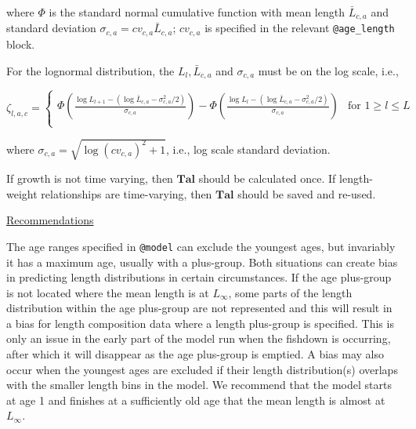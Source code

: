 \documentclass[a4paper,11pt,twoside,pdftex,draft]{article}
\begin{document}
where $\Phi$ is the standard normal cumulative function with mean length $\bar L_{c,a}$ and standard deviation $\sigma_{c,a} = cv_{c,a} \bar L_{c,a}$; $cv_{c,a}$ is specified in the relevant  \texttt{@age\_length} block.

For the lognormal distribution, the $L_{l}, \bar L_{c,a}$ and $\sigma_{c,a}$ must be on the log scale, i.e.,

\begin{equation}
\zeta_{l,a,c} =
\begin{cases}

\Phi\left( \frac{\log L_{l+1} - \left( \log\bar L_{c,a}  - \sigma_{c,a}^2/2 \right)}{\sigma_{c,a}} \right) - \Phi\left( \frac{\log L_{l} - \left( \log\bar L_{c,a}  - \sigma_{c,a}^2/2 \right)}{\sigma_{c,a}} \right) & \text{for } 1 \geq l \leq L \\

\end{cases}
\end{equation}

where $\sigma_{c,a} = \sqrt{\log(cv_{c,a})^2 + 1}$, i.e., log scale standard deviation.

If growth is not time varying, then $\mathbf{Tal}$ should be calculated once. If length-weight relationships are time-varying, then $\mathbf{Tal}$ should be saved and re-used.

\bigskip
\underline{Recommendations}

The age ranges specified in \texttt{@model} can exclude the youngest ages, but invariably it has a maximum age, usually with a plus-group. Both situations can create bias in predicting length distributions in certain circumstances.  If the age plus-group is not located where the mean length is at $L_{\infty}$, some parts of the length distribution within the age plus-group are not represented and this will result in a bias for length composition data where a length plus-group is specified. This is only an issue in the early part of the model run when the fishdown is occurring, after which it will disappear as the age plus-group is emptied.  A bias may also occur when the youngest ages are excluded if their length distribution(s) overlaps with the smaller length bins in the model. We recommend that the model starts at age 1 and finishes at a sufficiently old age that the mean length is almost at $L_{\infty}$. 
\end{document}
